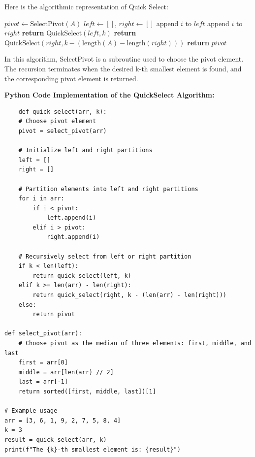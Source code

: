 \documentclass[12pt]{book} %
\begin{document}
Here is the algorithmic representation of Quick Select:
\FloatBarrier
\begin{algorithm}[H]
\caption{Quick Select Algorithm}
\begin{algorithmic}[1]
\State $pivot \gets \text{SelectPivot}(A)$ 
\State $left \gets []$, $right \gets []$
\State append $i$ to $left$
\State append $i$ to $right$
\EndIf
\EndFor
{}
\State \textbf{return} $\text{QuickSelect}(left, k)$ 
\State \textbf{return} $\text{QuickSelect}(right, k - (\text{length}(A) - \text{length}(right)))$ 
\Else
\State \textbf{return} $pivot$ 
\EndIf
\EndProcedure
\end{algorithmic}
\end{algorithm}
\FloatBarrier
In this algorithm, SelectPivot is a subroutine used to choose the pivot element. The recursion terminates when the desired k-th smallest element is found, and the corresponding pivot element is returned.

\textbf{Python Code Implementation of the QuickSelect Algorithm:}
\FloatBarrier
\begin{lstlisting}
    def quick_select(arr, k):
    # Choose pivot element
    pivot = select_pivot(arr)
    
    # Initialize left and right partitions
    left = []
    right = []
    
    # Partition elements into left and right partitions
    for i in arr:
        if i < pivot:
            left.append(i)
        elif i > pivot:
            right.append(i)
    
    # Recursively select from left or right partition
    if k < len(left):
        return quick_select(left, k)
    elif k >= len(arr) - len(right):
        return quick_select(right, k - (len(arr) - len(right)))
    else:
        return pivot

def select_pivot(arr):
    # Choose pivot as the median of three elements: first, middle, and last
    first = arr[0]
    middle = arr[len(arr) // 2]
    last = arr[-1]
    return sorted([first, middle, last])[1]

# Example usage
arr = [3, 6, 1, 9, 2, 7, 5, 8, 4]
k = 3
result = quick_select(arr, k)
print(f"The {k}-th smallest element is: {result}")
\end{lstlisting}
\end{document}
